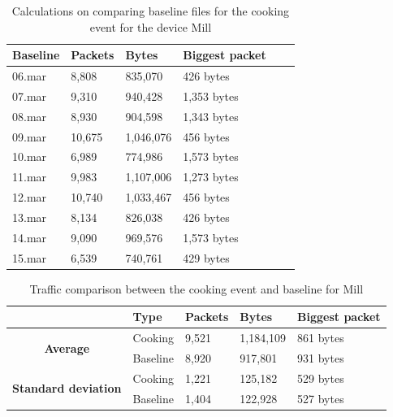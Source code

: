\begin{table}[H]
    \centering
    \caption{Calculations on comparing baseline files for the cooking event for the
device Mill}
    \begin{tabular}{|l|l|l|l|l|l|}
    \hline
        \textbf{Baseline} & \textbf{Packets} & \textbf{Bytes} & \textbf{Biggest packet} \\ \hline
        06.mar & 8,808  & 835,070   & 426 bytes \\ \hline
        07.mar & 9,310  & 940,428   & 1,353 bytes \\ \hline
        08.mar & 8,930  & 904,598   & 1,343 bytes \\ \hline
        09.mar & 10,675 & 1,046,076 & 456 bytes \\ \hline
        10.mar & 6,989  & 774,986   & 1,573 bytes \\ \hline
        11.mar & 9,983  & 1,107,006 & 1,273 bytes \\ \hline
        12.mar & 10,740 & 1,033,467 & 456 bytes \\ \hline
        13.mar & 8,134  & 826,038   & 426 bytes \\ \hline
        14.mar & 9,090  & 969,576   & 1,573 bytes \\ \hline
        15.mar & 6,539  & 740,761   & 429 bytes \\ \hline
    \end{tabular}
    \label{tab:MillBaselineCookingCalculations}
\end{table}

\begin{table}[H]
    \centering
    \caption{Traffic comparison between the cooking event and baseline for Mill}
    \begin{tabular}{c|l|l|l|l|}
        \cline{2-5}
        \multicolumn{1}{l|}{}                                              & \textbf{Type} & \textbf{Packets} & \textbf{Bytes} & \textbf{Biggest packet} \\ \hline
        \multicolumn{1}{|c|}{\multirow{2}{*}{\textbf{Average}}}            & Cooking         & 9,521              & 1,184,109       & 861 bytes               \\ \cline{2-5} 
        \multicolumn{1}{|c|}{}                                             & Baseline      & 8,920              & 917,801         & 931 bytes                \\ \hline
        \multicolumn{1}{|c|}{\multirow{2}{*}{\textbf{Standard deviation}}} & Cooking         & 1,221              & 125,182         & 529 bytes                 \\ \cline{2-5} 
        \multicolumn{1}{|c|}{}                                             & Baseline      & 1,404               & 122,928       &  527 bytes               \\ \hline          
    \end{tabular}
    \label{tab:MillComparingBaselineAndCookingCalculations}
\end{table}

